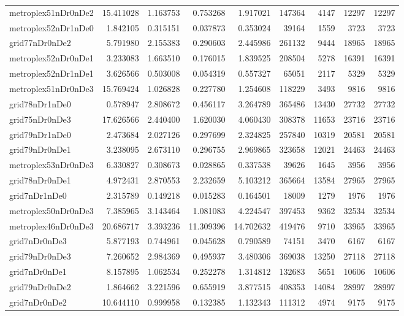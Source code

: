 \begin{longtable}{|l|r|r|r|r|r|r|r|r|}
metroplex51nDr0nDe2 & 15.411028 & 1.163753 & 0.753268 & 1.917021 & 147364 & 4147 & 12297 & 12297 \\
metroplex52nDr1nDe0 & 1.842105 & 0.315151 & 0.037873 & 0.353024 & 39164 & 1559 & 3723 & 3723 \\
grid77nDr0nDe2 & 5.791980 & 2.155383 & 0.290603 & 2.445986 & 261132 & 9444 & 18965 & 18965 \\
metroplex52nDr0nDe1 & 3.233083 & 1.663510 & 0.176015 & 1.839525 & 208504 & 5278 & 16391 & 16391 \\
metroplex52nDr1nDe1 & 3.626566 & 0.503008 & 0.054319 & 0.557327 & 65051 & 2117 & 5329 & 5329 \\
metroplex51nDr0nDe3 & 15.769424 & 1.026828 & 0.227780 & 1.254608 & 118229 & 3493 & 9816 & 9816 \\
grid78nDr1nDe0 & 0.578947 & 2.808672 & 0.456117 & 3.264789 & 365486 & 13430 & 27732 & 27732 \\
grid75nDr0nDe3 & 17.626566 & 2.440400 & 1.620030 & 4.060430 & 308378 & 11653 & 23716 & 23716 \\
grid79nDr1nDe0 & 2.473684 & 2.027126 & 0.297699 & 2.324825 & 257840 & 10319 & 20581 & 20581 \\
grid79nDr0nDe1 & 3.238095 & 2.673110 & 0.296755 & 2.969865 & 323658 & 12021 & 24463 & 24463 \\
metroplex53nDr0nDe3 & 6.330827 & 0.308673 & 0.028865 & 0.337538 & 39626 & 1645 & 3956 & 3956 \\
grid78nDr0nDe1 & 4.972431 & 2.870553 & 2.232659 & 5.103212 & 365664 & 13584 & 27965 & 27965 \\
grid7nDr1nDe0 & 2.315789 & 0.149218 & 0.015283 & 0.164501 & 18009 & 1279 & 1976 & 1976 \\
metroplex50nDr0nDe3 & 7.385965 & 3.143464 & 1.081083 & 4.224547 & 397453 & 9362 & 32534 & 32534 \\
metroplex46nDr0nDe3 & 20.686717 & 3.393236 & 11.309396 & 14.702632 & 419476 & 9710 & 33965 & 33965 \\
grid7nDr0nDe3 & 5.877193 & 0.744961 & 0.045628 & 0.790589 & 74151 & 3470 & 6167 & 6167 \\
grid79nDr0nDe3 & 7.260652 & 2.984369 & 0.495937 & 3.480306 & 369038 & 13250 & 27118 & 27118 \\
grid7nDr0nDe1 & 8.157895 & 1.062534 & 0.252278 & 1.314812 & 132683 & 5651 & 10606 & 10606 \\
grid79nDr0nDe2 & 1.864662 & 3.221596 & 0.655919 & 3.877515 & 408353 & 14084 & 28997 & 28997 \\
grid7nDr0nDe2 & 10.644110 & 0.999958 & 0.132385 & 1.132343 & 111312 & 4974 & 9175 & 9175 \\

\end{longtable}
